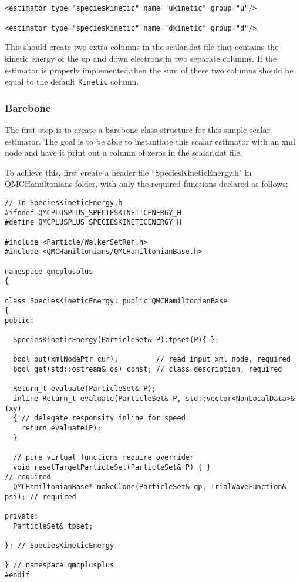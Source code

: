 \verb|<estimator type="specieskinetic" name="ukinetic" group="u"/>|

\verb|<estimator type="specieskinetic" name="dkinetic" group="d"/>|.

This should create two extra columns in the scalar.dat file that contains the kinetic energy of the up and down electrons in two separate columns. If the estimator is properly implemented,then the sum of these two columns should be equal to the default \verb|Kinetic| column.

\subsubsection{Barebone}

The first step is to create a barebone class structure for this simple scalar estimator. The goal is to be able to instantiate this scalar estimator with an xml node and have it print out a column of zeros in the scalar.dat file. 

To achieve this, first create a header file ``SpeciesKineticEnergy.h" in QMCHamiltonians folder, with only the required functions declared as follows: 

\begin{lstlisting}[style=C++]
// In SpeciesKineticEnergy.h
#ifndef QMCPLUSPLUS_SPECIESKINETICENERGY_H
#define QMCPLUSPLUS_SPECIESKINETICENERGY_H

#include <Particle/WalkerSetRef.h>
#include <QMCHamiltonians/QMCHamiltonianBase.h>

namespace qmcplusplus
{

class SpeciesKineticEnergy: public QMCHamiltonianBase
{
public:
  
  SpeciesKineticEnergy(ParticleSet& P):tpset(P){ };
  
  bool put(xmlNodePtr cur);         // read input xml node, required
  bool get(std::ostream& os) const; // class description, required
  
  Return_t evaluate(ParticleSet& P);
  inline Return_t evaluate(ParticleSet& P, std::vector<NonLocalData>& Txy)
  { // delegate responsity inline for speed
    return evaluate(P);
  } 
  
  // pure virtual functions require overrider
  void resetTargetParticleSet(ParticleSet& P) { }                         // required
  QMCHamiltonianBase* makeClone(ParticleSet& qp, TrialWaveFunction& psi); // required

private:
  ParticleSet& tpset;

}; // SpeciesKineticEnergy

} // namespace qmcplusplus
#endif
\end{lstlisting}

